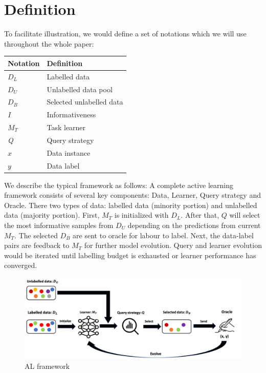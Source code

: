 \section{Definition}

To facilitate illustration, we would define a set of notations which we will use throughout the whole paper: 

\begin{table}[h]
\centering
\begin{tabular}{ll}
\hline \hline
Notation      & Definition               \\ \hline
\textit{$D_L$}    & Labelled data            \\
\textit{$D_U$}    & Unlabelled data pool     \\
\textit{$D_B$} & Selected unlabelled data \\
\textit{I}    & Informativeness          \\ 
\textit{$M_T$}    & Task learner             \\
\textit{Q}    & Query strategy     \\
\textit{$x$} & Data instance \\
\textit{$y$} & Data label \\
\hline
\hline
\end{tabular}
\end{table}

We describe the typical framework as follows: A complete active learning framework consists of several key components: Data, Learner, Query strategy and Oracle. 
There two types of data: labelled data (minority portion) and unlabelled data (majority portion). 
First, $M_T$ is initialized with $D_L$. After that, $Q$ will select the most informative samples from $D_U$ depending on the predictions from current $M_T$. The selected $D_B$ are sent to oracle for labour to label. Next, the data-label pairs are feedback to $M_T$ for further model evolution. Query and learner evolution would be iterated until labelling budget is exhausted or learner performance has converged.  

\begin{figure}[h!]
    \centering
    \includegraphics[width=\textwidth]{images/al_framework.png}
    \caption{AL framework}
    \label{fig:framework}
\end{figure}

